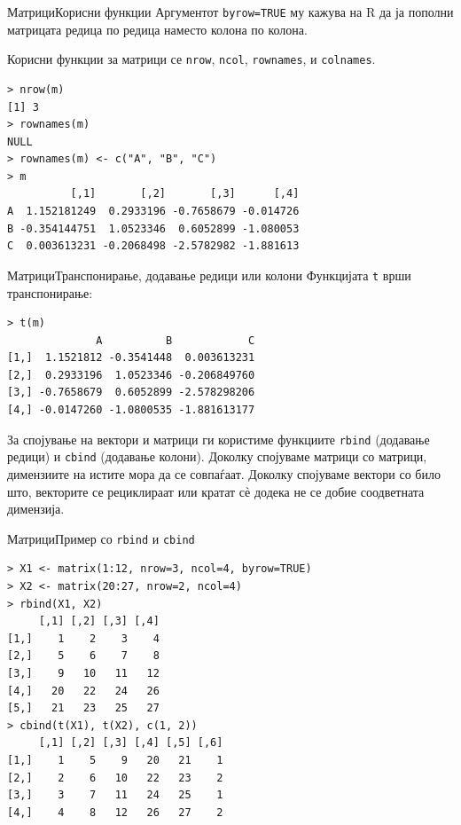\documentclass[hyperref={unicode}, xcolor={svgnames, table},
usepdftitle=false]{beamer}
\theoremstyle{remark}
\begin{document}
\begin{frame}[fragile]{Матрици}{Корисни функции}
  Аргументот \texttt{byrow=TRUE} му кажува на R да ја пополни матрицата
  редица по редица наместо колона по колона.

  Корисни функции за матрици се \texttt{nrow}, \texttt{ncol},
  \texttt{rownames}, и \texttt{colnames}.
\begin{verbatim}
> nrow(m)
[1] 3
> rownames(m)
NULL
> rownames(m) <- c("A", "B", "C")
> m
          [,1]       [,2]       [,3]      [,4]
A  1.152181249  0.2933196 -0.7658679 -0.014726
B -0.354144751  1.0523346  0.6052899 -1.080053
C  0.003613231 -0.2068498 -2.5782982 -1.881613
\end{verbatim}
\end{frame}

\begin{frame}[fragile]{Матрици}{Транспонирање, додавање редици или колони}
  Функцијата \texttt{t} врши транспонирање:
\begin{verbatim}
> t(m)
              A          B            C
[1,]  1.1521812 -0.3541448  0.003613231
[2,]  0.2933196  1.0523346 -0.206849760
[3,] -0.7658679  0.6052899 -2.578298206
[4,] -0.0147260 -1.0800535 -1.881613177
\end{verbatim}

  За спојување на вектори и матрици ги користиме функциите \texttt{rbind}
  (додавање редици) и \texttt{cbind} (додавање колони).  Доколку
  спојуваме матрици со матрици, димензиите на истите мора да се совпаѓаат.
  Доколку спојуваме вектори со било што, векторите се рециклираат или кратат сѐ
  додека не се добие соодветната димензија.
\end{frame}

\begin{frame}[fragile]{Матрици}{Пример со \texttt{rbind} и \texttt{cbind}}
\begin{verbatim}
> X1 <- matrix(1:12, nrow=3, ncol=4, byrow=TRUE)
> X2 <- matrix(20:27, nrow=2, ncol=4)
> rbind(X1, X2)
     [,1] [,2] [,3] [,4]
[1,]    1    2    3    4
[2,]    5    6    7    8
[3,]    9   10   11   12
[4,]   20   22   24   26
[5,]   21   23   25   27
> cbind(t(X1), t(X2), c(1, 2))
     [,1] [,2] [,3] [,4] [,5] [,6]
[1,]    1    5    9   20   21    1
[2,]    2    6   10   22   23    2
[3,]    3    7   11   24   25    1
[4,]    4    8   12   26   27    2
\end{verbatim}
\end{frame}
\end{document}
